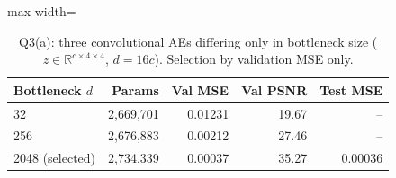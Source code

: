 \begin{table}[t]\centering\footnotesize\setlength{\tabcolsep}{3pt}
\begin{adjustbox}{max width=\columnwidth}
\begin{tabular}{lrrrr}\toprule
Bottleneck $d$ & Params & Val MSE & Val PSNR & Test MSE \\\midrule
32 & 2,669,701 & 0.01231 & 19.67 & -- \\
256 & 2,676,883 & 0.00212 & 27.46 & -- \\
2048 (selected) & 2,734,339 & 0.00037 & 35.27 & 0.00036 \\
\bottomrule\end{tabular}
\end{adjustbox}
\caption{Q3(a): three convolutional AEs differing only in bottleneck size ($z\in\mathbb{R}^{c\times4\times4}$, $d=16c$). Selection by validation MSE only.}\label{tab:q3a}\end{table}

